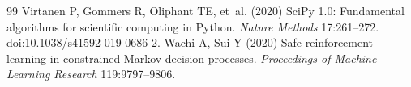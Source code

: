 \begin{thebibliography}{99}
Virtanen P, Gommers R, Oliphant TE, et~al. (2020) SciPy 1.0: Fundamental algorithms for scientific computing in Python. \emph{Nature Methods} 17:261--272. doi:10.1038/s41592-019-0686-2.
Wachi A, Sui Y (2020) Safe reinforcement learning in constrained Markov decision processes. \emph{Proceedings of Machine Learning Research} 119:9797--9806.

\end{thebibliography}
